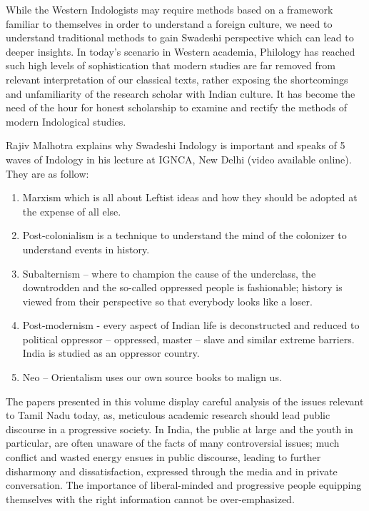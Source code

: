 While the Western Indologists may require methods based on a framework familiar to themselves in order to understand a foreign culture, we need to understand traditional methods to gain Swadeshi perspective which can lead to deeper insights. In today’s scenario in Western academia, Philology has reached such high levels of sophistication that modern studies are far removed from relevant interpretation of our classical texts, rather exposing the shortcomings and unfamiliarity of the research scholar with Indian culture. It has become the need of the hour for honest scholarship to examine and rectify the methods of modern Indological studies.

Rajiv Malhotra explains why Swadeshi Indology is important and speaks of 5 waves of Indology in his lecture at IGNCA, New Delhi (video available online). They are as follow:

\begin{enumerate}[{\rm 1)}]
\itemsep=0pt
\item Marxism which is all about Leftist ideas and how they should be adopted at the expense of all else.

 \item Post-colonialism is a technique to understand the mind of the colonizer to understand events in history.

 \item Subalternism – where to champion the cause of the underclass, the downtrodden and the so-called oppressed people is fashionable; history is viewed from their perspective so that everybody looks like a loser. 

 \item Post-modernism - every aspect of Indian life is deconstructed and reduced to political oppressor – oppressed, master – slave and similar extreme barriers. India is studied as an oppressor country.

 \item Neo – Orientalism uses our own source books to malign us.

\end{enumerate}

The papers presented in this volume display careful analysis of the issues relevant to Tamil Nadu today, as, meticulous academic research should lead public discourse in a progressive society. In India, the public at large and the youth in particular, are often unaware of the facts of many controversial issues; much conflict and wasted energy ensues in public discourse, leading to further disharmony and dissatisfaction, expressed through the media and in private conversation. The importance of liberal-minded and progressive people equipping themselves with the right information cannot be over-emphasized.

